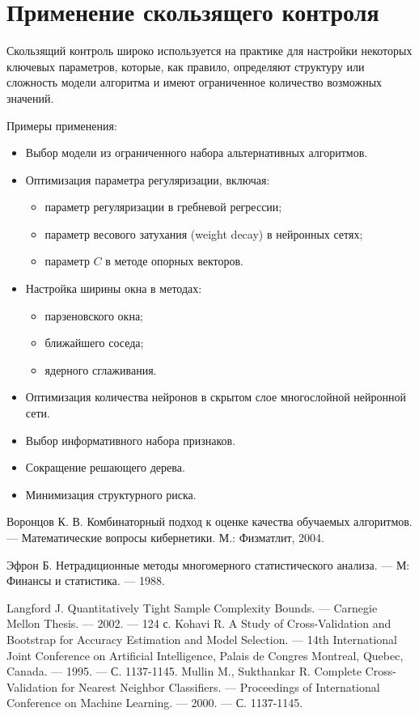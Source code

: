 \section{Применение скользящего контроля}

Скользящий контроль широко используется на практике для настройки некоторых ключевых параметров, которые, как правило, определяют структуру или сложность модели алгоритма и имеют ограниченное количество возможных значений.

Примеры применения:

\begin{itemize}
    \item Выбор модели из ограниченного набора альтернативных алгоритмов.
    \item Оптимизация параметра регуляризации, включая:
    \begin{itemize}
        \item параметр регуляризации в гребневой регрессии;
        \item параметр весового затухания (weight decay) в нейронных сетях;
        \item параметр \( C \) в методе опорных векторов.
    \end{itemize}
    \item Настройка ширины окна в методах:
    \begin{itemize}
        \item парзеновского окна;
        \item ближайшего соседа;
        \item ядерного сглаживания.
    \end{itemize}
    \item Оптимизация количества нейронов в скрытом слое многослойной нейронной сети.
    \item Выбор информативного набора признаков.
    \item Сокращение решающего дерева.
    \item Минимизация структурного риска.
\end{itemize}

\begin{thebibliography}{5}

Воронцов К. В. Комбинаторный подход к оценке качества обучаемых алгоритмов. — Математические вопросы кибернетики. М.: Физматлит, 2004.

Эфрон Б. Нетрадиционные методы многомерного статистического анализа. — М: Финансы и статистика. — 1988.

Langford J. Quantitatively Tight Sample Complexity Bounds. — Carnegie Mellon Thesis. — 2002. — 124 с.
Kohavi R. A Study of Cross-Validation and Bootstrap for Accuracy Estimation and Model Selection. — 14th International Joint Conference on Artificial Intelligence, Palais de Congres Montreal, Quebec, Canada. — 1995. — С. 1137-1145.
Mullin M., Sukthankar R. Complete Cross-Validation for Nearest Neighbor Classifiers. — Proceedings of International Conference on Machine Learning. — 2000. — С. 1137-1145.

\end{thebibliography}

